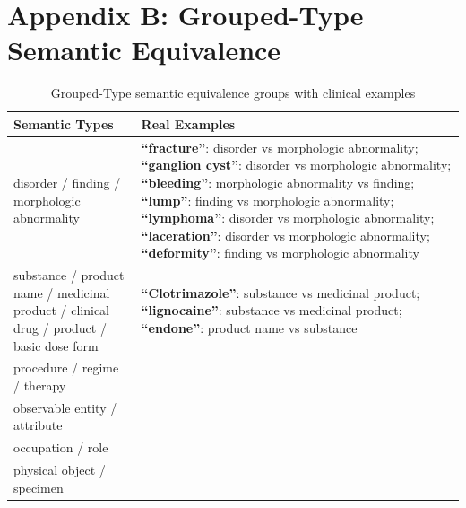 \documentclass[11pt]{article}
\begin{document}
\section{Appendix B: Grouped-Type Semantic Equivalence}

\begin{table}[h!]
\centering
\scriptsize
\setlength{\tabcolsep}{3pt}
\caption{Grouped-Type semantic equivalence groups with clinical examples}
\label{tab:grouped-semantic-types}
\begin{tabular}{p{3.8cm}p{9.7cm}}
\toprule
\textbf{Semantic Types} & \textbf{Real Examples} \\
\midrule
disorder / finding / morphologic abnormality &
\textbf{``fracture''}: disorder vs morphologic abnormality; \textbf{``ganglion cyst''}: disorder vs morphologic abnormality; \textbf{``bleeding''}: morphologic abnormality vs finding; \textbf{``lump''}: finding vs morphologic abnormality; \textbf{``lymphoma''}: disorder vs morphologic abnormality; \textbf{``laceration''}: disorder vs morphologic abnormality; \textbf{``deformity''}: finding vs morphologic abnormality\\
\midrule
substance / product name / medicinal product / clinical drug / product / basic dose form &
\textbf{``Clotrimazole''}: substance vs medicinal product; \textbf{``lignocaine''}: substance vs medicinal product; \textbf{``endone''}: product name vs substance\\
\midrule
procedure / regime / therapy & \\
\midrule
observable entity / attribute & \\
\midrule
occupation / role & \\
\midrule
physical object / specimen & \\
\bottomrule
\end{tabular}
\end{table}
\end{document}
